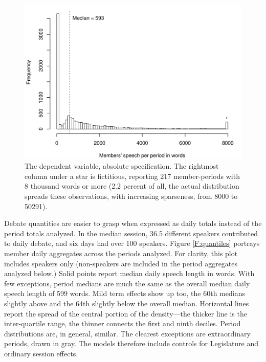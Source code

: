 \documentclass[letter,12pt]{article}
\begin{document}
\begin{figure}
  \centering
    \includegraphics[width=.8\columnwidth]{../plots/dv-histogram.pdf}
    \caption{The dependent variable, absolute specification. The rightmost column under a star is fictitious, reporting 217 member-periods with 8 thousand words or more (2.2 percent of all, the actual distribution spreads these observations, with increasing sparseness, from 8000 to 50291).}\label{F:dv-hist}
\end{figure}


Debate quantities are easier to grasp when expressed as daily totals instead of the period totals analyzed. In the median session, 36.5 different speakers contributed to daily debate, and six days had over 100 speakers. Figure \ref{F:quantiles} portrays member daily aggregates across the periods analyzed. For clarity, this plot includes speakers only (non-speakers are included in the period aggregates analyzed below.) Solid points report median daily speech length in words. With few exceptions, period medians are much the same as the overall median daily speech length of 599 words. Mild term effects show up too, the 60th medians slightly above and the 64th slightly below the overall median. Horizontal lines report the spread of the central portion of the density---the thicker line is the inter-quartile range, the thinner connects the first and ninth deciles. Period distributions are, in general, similar. The clearest exceptions are extraordinary periods, drawn in gray. The models therefore include controls for Legislature and ordinary session effects.
\end{document}
